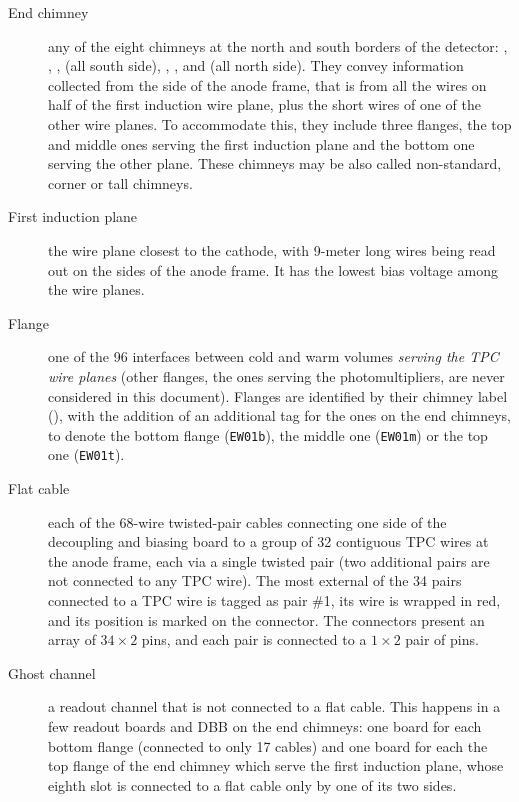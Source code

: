 \begin{description}
  \item[End chimney]
    any of the eight chimneys at the north and south borders of the detector:
    , , ,  (all south side),
    , ,  and  (all north side).
    They convey information collected from the side of the anode frame, that is
    from all the wires on half of the first induction wire plane,
    plus the short wires of one of the other wire planes.
    To accommodate this, they include three flanges, the top and middle ones
    serving the first induction plane and the bottom one serving the other plane.
    These chimneys may be also called non-standard, corner or tall chimneys.

  \item[First induction plane]
    the wire plane closest to the cathode,
    with 9-meter long wires being read out on the sides of the anode frame.
    It has the lowest bias voltage among the wire planes.

  \item[Flange]
    one of the 96 interfaces between cold and warm volumes
    \emph{serving the TPC wire planes}
    (other flanges, \eg the ones serving the photomultipliers, are never
    considered in this document).
    Flanges are identified by their chimney label (\eg {}), with the
    addition of an additional tag for the ones on the end chimneys,
    to denote the bottom flange (\texttt{EW01b}),
    the middle one (\texttt{EW01m}) or the top one (\texttt{EW01t}).

  \item[Flat cable]
    each of the 68-wire twisted-pair cables connecting one side
    of the decoupling and biasing board to a group of 32 contiguous TPC wires
    at the anode frame, each via a single twisted pair (two additional pairs are
    not connected to any TPC wire). The most external of the 34 pairs connected
    to a TPC wire is tagged as pair \#1, its wire is wrapped in red, and its
    position is marked on the connector. The connectors present an array of
    $34 \times 2$ pins, and each pair is connected to a $1 \times 2$ pair of
    pins.

  \item[Ghost channel]
    a readout channel that is not connected to a flat cable.
    This happens in a few readout boards and DBB on the end chimneys:
    one board for each bottom flange (connected to only 17 cables)
    and one board for each the top flange of the end chimney which serve the
    first induction plane, whose eighth slot is connected to a flat cable only
    by one of its two sides.
  

\end{description}
